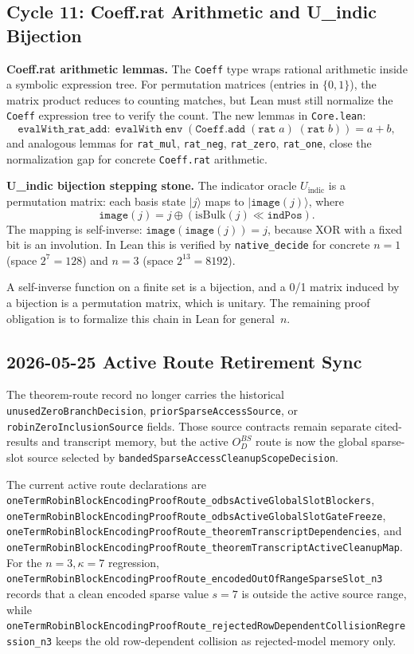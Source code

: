 \subsection{Cycle 11: Coeff.rat Arithmetic and U\_indic Bijection}

\textbf{Coeff.rat arithmetic lemmas.}
The \texttt{Coeff} type wraps rational arithmetic inside a symbolic expression
tree.  For permutation matrices (entries in $\{0, 1\}$), the matrix product
reduces to counting matches, but Lean must still normalize the \texttt{Coeff}
expression tree to verify the count.  The new lemmas in \texttt{Core.lean}:
\[
  \texttt{evalWith\_rat\_add}: \;
  \texttt{evalWith}\;\texttt{env}\;(\texttt{Coeff.add}\;(\texttt{rat}\;a)\;(\texttt{rat}\;b)) = a + b,
\]
and analogous lemmas for \texttt{rat\_mul}, \texttt{rat\_neg}, \texttt{rat\_zero},
\texttt{rat\_one}, close the normalization gap for concrete \texttt{Coeff.rat}
arithmetic.

\textbf{U\_indic bijection stepping stone.}
The indicator oracle $U_{\mathrm{indic}}$ is a permutation matrix: each basis
state $|j\rangle$ maps to $|\texttt{image}(j)\rangle$, where
\[
  \texttt{image}(j) = j \oplus (\mathrm{isBulk}(j) \ll \texttt{indPos}).
\]
The mapping is self-inverse: $\texttt{image}(\texttt{image}(j)) = j$, because
XOR with a fixed bit is an involution.  In Lean this is verified by
\texttt{native\_decide} for concrete $n = 1$ (space $2^7 = 128$) and
$n = 3$ (space $2^{13} = 8192$).

A self-inverse function on a finite set is a bijection, and a 0/1 matrix
induced by a bijection is a permutation matrix, which is unitary.  The
remaining proof obligation is to formalize this chain in Lean for general~$n$.

\subsection{2026-05-25 Active Route Retirement Sync}

The theorem-route record no longer carries the historical
\texttt{unusedZeroBranchDecision}, \texttt{priorSparseAccessSource}, or
\texttt{robinZeroInclusionSource} fields.  Those source contracts remain
separate cited-results and transcript memory, but the active \(O_D^{BS}\)
route is now the global sparse-slot source selected by
\texttt{bandedSparseAccessCleanupScopeDecision}.

The current active route declarations are
\texttt{oneTermRobinBlockEncodingProofRoute\_odbsActiveGlobalSlotBlockers},
\texttt{oneTermRobinBlockEncodingProofRoute\_odbsActiveGlobalSlotGateFreeze},
\texttt{oneTermRobinBlockEncodingProofRoute\_theoremTranscriptDependencies},
and
\texttt{oneTermRobinBlockEncodingProofRoute\_theoremTranscriptActiveCleanupMap}.
For the \(n=3,\kappa=7\) regression,
\texttt{oneTermRobinBlockEncodingProofRoute\_encodedOutOfRangeSparseSlot\_n3}
records that a clean encoded sparse value \(s=7\) is outside the active source
range, while
\texttt{oneTermRobinBlockEncodingProofRoute\_rejectedRowDependentCollisionRegression\_n3}
keeps the old row-dependent collision as rejected-model memory only.

